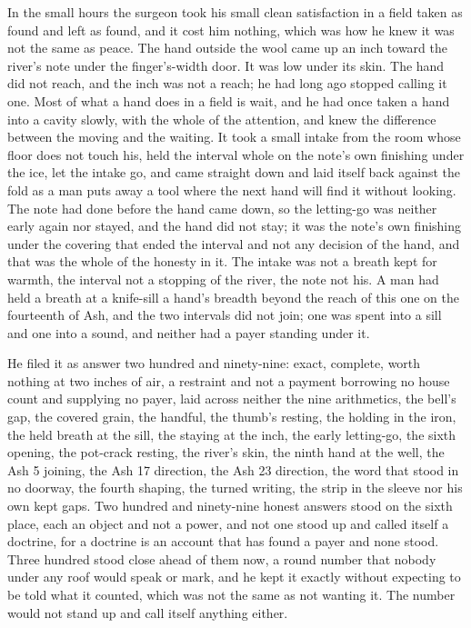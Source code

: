 In the small hours the surgeon took his small clean satisfaction in a field taken as found and left as found, and it cost him nothing, which was how he knew it was not the same as peace. The hand outside the wool came up an inch toward the river's note under the finger's-width door. It was low under its skin. The hand did not reach, and the inch was not a reach; he had long ago stopped calling it one. Most of what a hand does in a field is wait, and he had once taken a hand into a cavity slowly, with the whole of the attention, and knew the difference between the moving and the waiting. It took a small intake from the room whose floor does not touch his, held the interval whole on the note's own finishing under the ice, let the intake go, and came straight down and laid itself back against the fold as a man puts away a tool where the next hand will find it without looking. The note had done before the hand came down, so the letting-go was neither early again nor stayed, and the hand did not stay; it was the note's own finishing under the covering that ended the interval and not any decision of the hand, and that was the whole of the honesty in it. The intake was not a breath kept for warmth, the interval not a stopping of the river, the note not his. A man had held a breath at a knife-sill a hand's breadth beyond the reach of this one on the fourteenth of Ash, and the two intervals did not join; one was spent into a sill and one into a sound, and neither had a payer standing under it.

He filed it as answer two hundred and ninety-nine: exact, complete, worth nothing at two inches of air, a restraint and not a payment borrowing no house count and supplying no payer, laid across neither the nine arithmetics, the bell's gap, the covered grain, the handful, the thumb's resting, the holding in the iron, the held breath at the sill, the staying at the inch, the early letting-go, the sixth opening, the pot-crack resting, the river's skin, the ninth hand at the well, the Ash 5 joining, the Ash 17 direction, the Ash 23 direction, the word that stood in no doorway, the fourth shaping, the turned writing, the strip in the sleeve nor his own kept gaps. Two hundred and ninety-nine honest answers stood on the sixth place, each an object and not a power, and not one stood up and called itself a doctrine, for a doctrine is an account that has found a payer and none stood. Three hundred stood close ahead of them now, a round number that nobody under any roof would speak or mark, and he kept it exactly without expecting to be told what it counted, which was not the same as not wanting it. The number would not stand up and call itself anything either.

